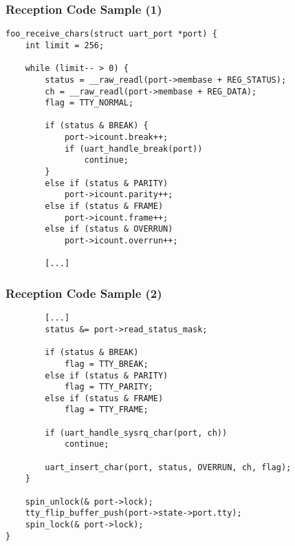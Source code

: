 \begin{frame}[fragile]
  \frametitle{Reception Code Sample (1)}
\begin{verbatim}
foo_receive_chars(struct uart_port *port) {
    int limit = 256;

    while (limit-- > 0) {
        status = __raw_readl(port->membase + REG_STATUS);
        ch = __raw_readl(port->membase + REG_DATA);
        flag = TTY_NORMAL;

        if (status & BREAK) {
            port->icount.break++;
            if (uart_handle_break(port))
                continue;
        }
        else if (status & PARITY)
            port->icount.parity++;
        else if (status & FRAME)
            port->icount.frame++;
        else if (status & OVERRUN)
            port->icount.overrun++;

        [...]
\end{verbatim}
\end{frame}

\begin{frame}[fragile]
\frametitle{Reception Code Sample (2)}
\begin{verbatim}
        [...]
        status &= port->read_status_mask;

        if (status & BREAK)
            flag = TTY_BREAK;
        else if (status & PARITY)
            flag = TTY_PARITY;
        else if (status & FRAME)
            flag = TTY_FRAME;

        if (uart_handle_sysrq_char(port, ch))
            continue;

        uart_insert_char(port, status, OVERRUN, ch, flag);
    }

    spin_unlock(& port->lock);
    tty_flip_buffer_push(port->state->port.tty);
    spin_lock(& port->lock);
}
\end{verbatim}
\end{frame}

